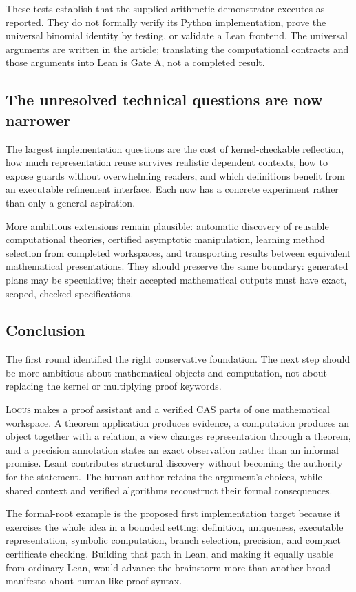 \documentclass[11pt,letterpaper]{article}
\newcommand{\Locus}{\textsc{Locus}}
\theoremstyle{definition}
\theoremstyle{remark}
\begin{document}
These tests establish that the supplied arithmetic demonstrator executes as
reported. They do not formally verify its Python implementation, prove the
universal binomial identity by testing, or validate a Lean frontend. The
universal arguments are written in the article; translating the computational
contracts and those arguments into Lean is Gate A, not a completed result.

\subsection{The unresolved technical questions are now narrower}
The largest implementation questions are the cost of kernel-checkable reflection,
how much representation reuse survives realistic dependent contexts, how to
expose guards without overwhelming readers, and which definitions benefit from
an executable refinement interface. Each now has a concrete experiment rather
than only a general aspiration.

More ambitious extensions remain plausible: automatic discovery of reusable
computational theories, certified asymptotic manipulation, learning method
selection from completed workspaces, and transporting results between equivalent
mathematical presentations. They should preserve the same boundary: generated
plans may be speculative; their accepted mathematical outputs must have exact,
scoped, checked specifications.

\subsection{Conclusion}
The first round identified the right conservative foundation. The next step
should be more ambitious about mathematical objects and computation, not about
replacing the kernel or multiplying proof keywords.

\Locus{} makes a proof assistant and a verified CAS parts of one mathematical
workspace. A theorem application produces evidence, a computation produces an
object together with a relation, a view changes representation through a theorem,
and a precision annotation states an exact observation rather than an informal
promise. Leant contributes structural discovery without becoming the authority
for the statement. The human author retains the argument's choices, while
shared context and verified algorithms reconstruct their formal consequences.

The formal-root example is the proposed first implementation target because it
exercises the whole idea in a bounded setting: definition, uniqueness, executable
representation, symbolic computation, branch selection, precision, and compact
certificate checking. Building that path in Lean, and making it equally usable
from ordinary Lean, would advance the brainstorm more than another broad
manifesto about human-like proof syntax.
\end{document}
